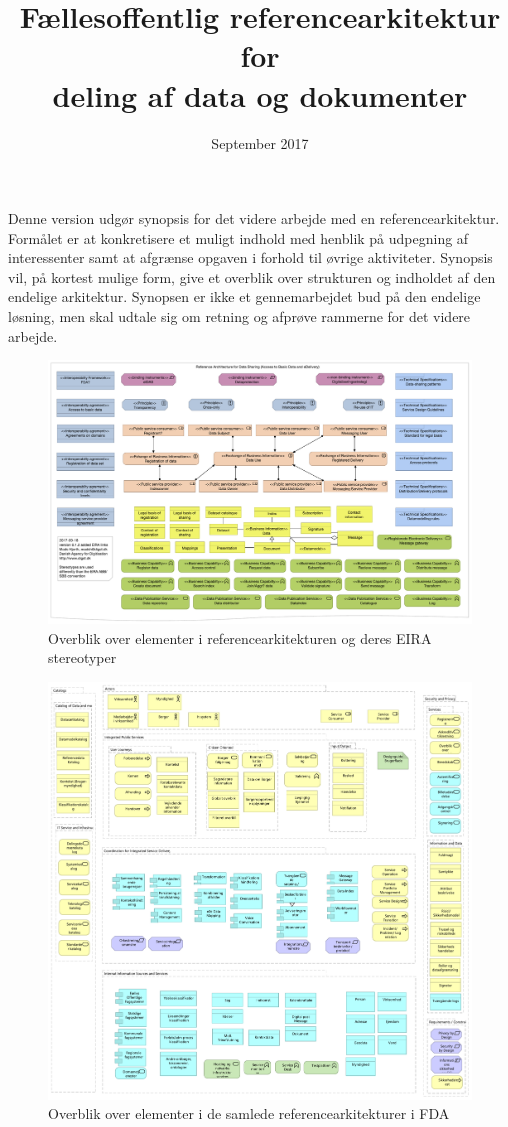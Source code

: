 \documentclass[12pt]{article}
\title{Fællesoffentlig referencearkitektur for \\ deling af data og dokumenter}
\author{}
\date{September 2017}
\begin{document}
\maketitle

Denne version udgør synopsis for det videre arbejde med en referencearkitektur.
Formålet er at konkretisere et muligt indhold med henblik på udpegning af interessenter samt at afgrænse opgaven i forhold til øvrige aktiviteter.
Synopsis vil, på kortest mulige form, give et overblik over strukturen og indholdet af den endelige arkitektur. Synopsen er ikke et gennemarbejdet bud på den endelige løsning, men skal udtale sig om retning og afprøve rammerne for det videre arbejde.

\tableofcontents
\newpage




\newpage
\thispagestyle{empty}
\begin{figure}
\centering
\includegraphics[angle=90, height=\textheight]{../overview.pdf}
\caption{Overblik over elementer i referencearkitekturen og deres EIRA stereotyper}
\end{figure}

\newpage
\thispagestyle{empty}
\begin{figure}
\centering
\includegraphics[angle=0, width=\textwidth]{../eco2.pdf}
\caption{Overblik over elementer i de samlede referencearkitekturer i FDA}
\end{figure}
\end{document}
